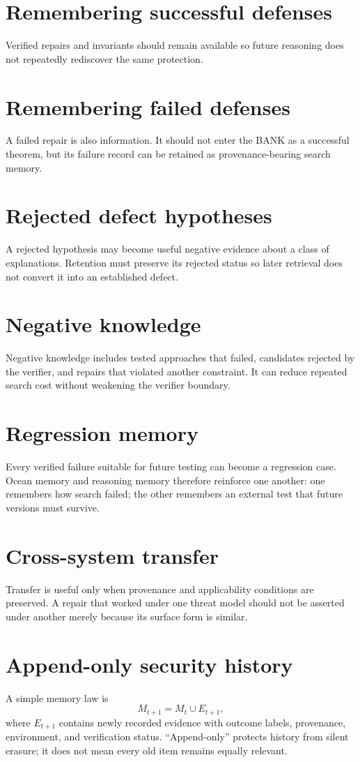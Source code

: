\documentclass[11pt,oneside]{book}
\theoremstyle{definition}
\theoremstyle{remark}
\begin{document}
\section{Remembering successful defenses}
Verified repairs and invariants should remain available so future reasoning does not repeatedly rediscover the same protection.

\section{Remembering failed defenses}
A failed repair is also information. It should not enter the BANK as a successful theorem, but its failure record can be retained as provenance-bearing search memory.

\section{Rejected defect hypotheses}
A rejected hypothesis may become useful negative evidence about a class of explanations. Retention must preserve its rejected status so later retrieval does not convert it into an established defect.

\section{Negative knowledge}
Negative knowledge includes tested approaches that failed, candidates rejected by the verifier, and repairs that violated another constraint. It can reduce repeated search cost without weakening the verifier boundary.

\section{Regression memory}
Every verified failure suitable for future testing can become a regression case. Ocean memory and reasoning memory therefore reinforce one another: one remembers how search failed; the other remembers an external test that future versions must survive.

\section{Cross-system transfer}
Transfer is useful only when provenance and applicability conditions are preserved. A repair that worked under one threat model should not be asserted under another merely because its surface form is similar.

\section{Append-only security history}
\label{sec:append-memory}
A simple memory law is
\[
M_{t+1}=M_t\cup E_{t+1},
\]
where $E_{t+1}$ contains newly recorded evidence with outcome labels, provenance, environment, and verification status. ``Append-only'' protects history from silent erasure; it does not mean every old item remains equally relevant.
\end{document}
